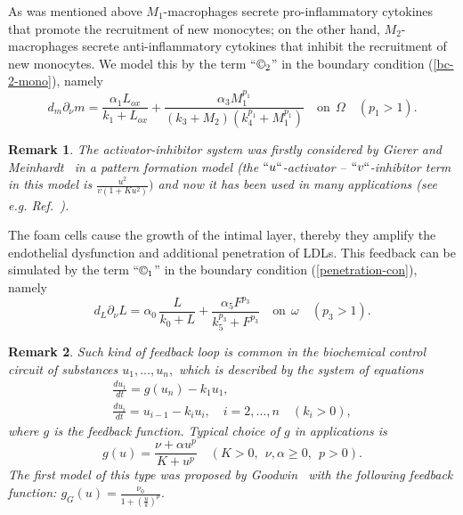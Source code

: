 \documentclass[reqno]{amsart}            %
\newtheorem{remark}{Remark}[section]
\numberwithin{equation}{section}
\begin{document}
As was mentioned above $M_1$-macrophages secrete pro-inflammatory cytokines
that promote the recruitment of new monocytes; on the other hand, $M_2$-macrophages secrete anti-inflammatory cytokines that inhibit the recruitment of new monocytes. We model this  by the term ``${\copyright_2}$''  in the boundary condition (\ref{bc-2-mono}), namely
\begin{equation}\label{bc-5}
d_m \partial_{\nu} m = \frac{\alpha_1 L_{ox}}{k_1 + L_{ox}} + \frac{\alpha_3 M_1^{p_1}}{(k_3 + M_2)(k_4^{p_1} + M_1^{p_1})} \quad \text{on} \ \ \Omega \quad (p_1 >1).
\end{equation}

\begin{remark}
The activator-inhibitor system was firstly considered by Gierer and Meinhardt~\cite{GerMei}
in a pattern formation model (the $``u``$-activator -- $``v``$-inhibitor term in this model is
${\frac{u^2}{v(1+ K u^2)}})$
and now it has been used in many applications (see e.g. Ref.~\cite{Murray-2}).
\end{remark}


The foam cells cause the growth of the intimal layer, thereby they amplify the endothelial dysfunction
and additional penetration of LDLs. This feedback can be simulated by the term ``${\copyright_1}$''  in the boundary condition (\ref{penetration-con}), namely
\begin{equation}\label{bc-4}
d_L \partial_{\nu} L =  \alpha_0\, \frac{L}{k_0 + L} + \frac{\alpha_5 F^{p_3}}{k_5^{p_3} + F^{p_3}}  \quad \text{on} \ \ \omega \quad (p_3  >1).
\end{equation}

\begin{remark}
Such kind of feedback loop is common in the biochemical control circuit of substances $u_1,\ldots, u_n,$ which  is described by the system of equations
\begin{gather*}
\frac{d u_1}{dt} = g(u_n) - k_1 u_1,
\\
\frac{d u_i}{dt} = u_{i-1} - k_i u_i, \quad i=2,\ldots,n \quad (k_i >0),
\end{gather*}
where $g$ is the feedback function. Typical choice of $g$ in applications is
$$
g(u)= \frac{\nu + \alpha u^p}{K + u^p} \quad (K > 0, \ \ \nu, \alpha \ge 0, \ \ p > 0).
$$
The first model of this type was proposed by Goodwin~\cite{Goodwin} with the following feedback function:
$
\displaystyle{g_G(u) = \frac{\nu_0}{1+ (\frac{u}{k})^p}}.
$
\end{remark}
\end{document}
